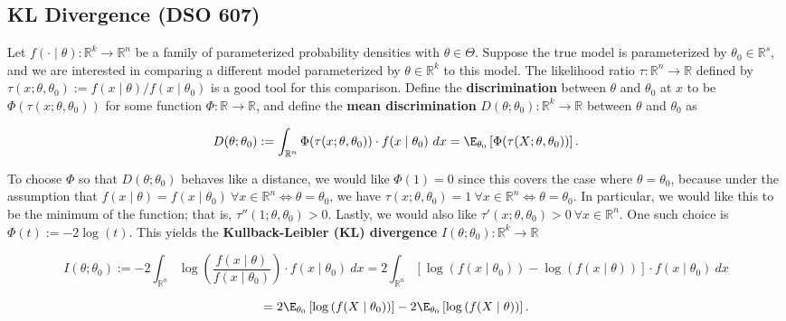 %
%
%
%



\subsection{KL Divergence (DSO 607)}\label{prob.kl.divergence}

Let \(f(\cdot \mid \theta): \mathbb{R}^k \to \mathbb{R}^n\) be a family of parameterized probability densities with \(\theta \in \Theta\). Suppose the true model is parameterized by \(\theta_0 \in \mathbb{R}^s\), and we are interested in comparing a different model parameterized by \(\theta \in \mathbb{R}^k\) to this model. The likelihood ratio \(\tau: \mathbb{R}^n \to \mathbb{R}\) defined by \(\tau(x; \theta, \theta_0) := f(x \mid \theta)/f(x \mid \theta_0)\) is a good tool for this comparison. Define the \textbf{discrimination} between \(\theta\) and \(\theta_0\) at \(x\) to be \(\Phi(\tau(x; \theta, \theta_0))\) for some function \(\Phi: \mathbb{R} \to \mathbb{R}\), and define the \textbf{mean discrimination} \(D(\theta; \theta_0): \mathbb{R}^k \to \mathbb{R}\) between \(\theta\) and \(\theta_0\) as

\[
D(\theta; \theta_0) := \int_{\mathbb{R}^n} \Phi(\tau(x; \theta, \theta_0)) \cdot f(x \mid \theta_0) \ dx = \E_{\theta_0} \left[ \Phi(\tau(X; \theta, \theta_0)) \right].
\]

To choose \(\Phi\) so that \(D(\theta; \theta_0)\) behaves like a distance, we would like \(\Phi(1) = 0\) since this covers the case where \(\theta = \theta_0\), because under the assumption that \(f(x \mid \theta) = f(x \mid \theta_0) \ \forall x \in \mathbb{R}^n \iff \theta = \theta_0\), we have \(\tau(x; \theta, \theta_0) = 1 \ \forall x \in \mathbb{R}^n  \iff \theta = \theta_0\). In particular, we would like this to be the minimum of the function; that is, \(\tau''(1; \theta, \theta_0) > 0\). Lastly, we would also like \(\tau'(x; \theta, \theta_0) > 0 \ \forall x \in \mathbb{R}^n\). One such choice is \(\Phi(t) := - 2 \log (t)\). This yields the \textbf{Kullback-Leibler (KL) divergence} \(I(\theta; \theta_0) : \mathbb{R}^k \to \mathbb{R}\)

\[
I(\theta; \theta_0) := -2\int_{\mathbb{R}^n} \log \left( \frac{f(x \mid \theta)}{f(x \mid \theta_0)} \right) \cdot f(x \mid \theta_0) \ dx = 2\int_{\mathbb{R}^n} \left[ \log \left( f(x \mid \theta_0) \right) - \log \left( f(x \mid \theta) \right) \right]\cdot f(x \mid \theta_0) \ dx \]

\[
= 2\E_{\theta_0} \left[ \log \left( f(X \mid \theta_0) \right) \right] - 2 \E_{\theta_0} \left[ \log \left( f(X \mid \theta) \right) \right].
\]

